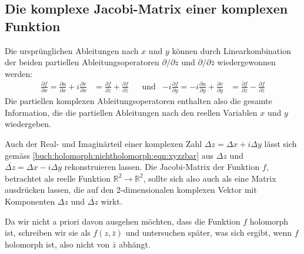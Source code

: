 %
%
%
\subsection{Die komplexe Jacobi-Matrix einer komplexen Funktion}
Die ursprünglichen Ableitungen nach $x$ und $y$ können durch Linearkombination
der beiden partiellen Ableitungsoperatoren $\partial/\partial z$ und
$\partial/\partial\bar{z}$ wiedergewonnen werden:
\begin{align*}
\frac{\partial f}{\partial x}
=
\frac{\partial u}{\partial x}
+
i\frac{\partial v}{\partial x}
&=
\frac{\partial f}{\partial z}
+
\frac{\partial f}{\partial \bar{z}}
&&\text{und}
&
-i
\frac{\partial f}{\partial y}
=
-i\frac{\partial u}{\partial y}
+
\frac{\partial v}{\partial y}
&=
\frac{\partial f}{\partial z}
-
\frac{\partial f}{\partial \bar{z}}
\end{align*}
Die partiellen komplexen Ableitungsoperatoren enthalten also die
gesamte Information, die die partiellen Ableitungen nach den reellen
Variablen $x$ und $y$ wiedergeben.

Auch der Real- und Imaginärteil einer komplexen Zahl
$\Delta z=\Delta x + i\Delta y$
lässt sich gemäss \eqref{buch:holomorph:nichtholomorph:eqn:xyzzbar}
aus $\Delta z$ und $\overline{\Delta z}=\Delta x -i\Delta y$
rekonstruieren lassen.
Die Jacobi-Matrix der Funktion $f$, betrachtet als reelle Funktion
$\mathbb{R}^2\to\mathbb{R}^2$, sollte sich also auch als eine Matrix
ausdrücken lassen, die auf den 2-dimensionalen komplexen
Vektor mit Komponenten $\Delta z$ und $\overline{\Delta z}$ wirkt.

Da wir nicht a priori davon ausgehen möchten, dass die Funktion $f$
holomorph ist, schreiben wir sie als $f(z,\bar{z})$ und untersuchen
später, was sich ergibt, wenn $f$ holomorph ist, also nicht von $\bar{z}$
abhängt.

